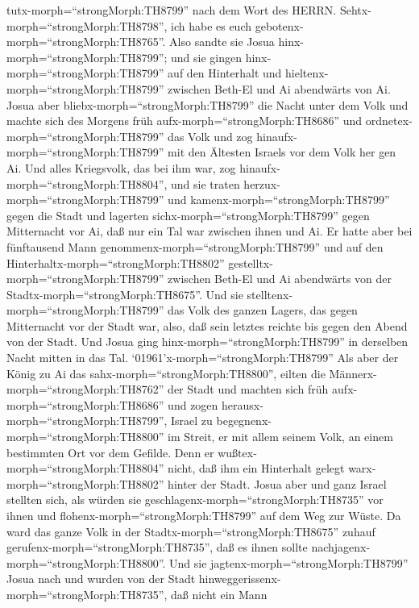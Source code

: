 tutx-morph=``strongMorph:TH8799'' nach dem Wort des HERRN.
Sehtx-morph=``strongMorph:TH8798'', ich habe es euch
gebotenx-morph=``strongMorph:TH8765''.  Also sandte sie
Josua hinx-morph=``strongMorph:TH8799''; und sie gingen
hinx-morph=``strongMorph:TH8799'' auf den Hinterhalt und
hieltenx-morph=``strongMorph:TH8799'' zwischen Beth-El und Ai abendwärts
von Ai. Josua aber bliebx-morph=``strongMorph:TH8799'' die Nacht unter
dem Volk  und machte sich des Morgens früh
aufx-morph=``strongMorph:TH8686'' und
ordnetex-morph=``strongMorph:TH8799'' das Volk und zog
hinaufx-morph=``strongMorph:TH8799'' mit den Ältesten Israels vor dem
Volk her gen Ai.  Und alles Kriegsvolk, das bei ihm war,
zog hinaufx-morph=``strongMorph:TH8804'', und sie traten
herzux-morph=``strongMorph:TH8799'' und
kamenx-morph=``strongMorph:TH8799'' gegen die Stadt und lagerten
sichx-morph=``strongMorph:TH8799'' gegen Mitternacht vor Ai, daß nur ein
Tal war zwischen ihnen und Ai.  Er hatte aber bei
fünftausend Mann genommenx-morph=``strongMorph:TH8799'' und auf den
Hinterhaltx-morph=``strongMorph:TH8802''
gestelltx-morph=``strongMorph:TH8799'' zwischen Beth-El und Ai
abendwärts von der Stadtx-morph=``strongMorph:TH8675''. 
Und sie stelltenx-morph=``strongMorph:TH8799'' das Volk des ganzen
Lagers, das gegen Mitternacht vor der Stadt war, also, daß sein letztes
reichte bis gegen den Abend von der Stadt. Und Josua ging
hinx-morph=``strongMorph:TH8799'' in derselben Nacht mitten in das Tal.
 `01961'\textbar x-morph=``strongMorph:TH8799'' Als aber
der König zu Ai das sahx-morph=``strongMorph:TH8800'', eilten die
Männerx-morph=``strongMorph:TH8762'' der Stadt und machten sich früh
aufx-morph=``strongMorph:TH8686'' und zogen
herausx-morph=``strongMorph:TH8799'', Israel zu
begegnenx-morph=``strongMorph:TH8800'' im Streit, er mit allem seinem
Volk, an einem bestimmten Ort vor dem Gefilde. Denn er
wußtex-morph=``strongMorph:TH8804'' nicht, daß ihm ein Hinterhalt gelegt
warx-morph=``strongMorph:TH8802'' hinter der Stadt.  Josua
aber und ganz Israel stellten sich, als würden sie
geschlagenx-morph=``strongMorph:TH8735'' vor ihnen und
flohenx-morph=``strongMorph:TH8799'' auf dem Weg zur Wüste.
 Da ward das ganze Volk in der
Stadtx-morph=``strongMorph:TH8675'' zuhauf
gerufenx-morph=``strongMorph:TH8735'', daß es ihnen sollte
nachjagenx-morph=``strongMorph:TH8800''.  Und sie
jagtenx-morph=``strongMorph:TH8799'' Josua nach und wurden von der Stadt
hinweggerissenx-morph=``strongMorph:TH8735'', daß nicht ein Mann

